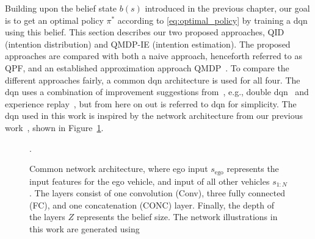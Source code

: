 
Building upon the belief state $b(s)$ introduced in the previous chapter, our goal is to get an optimal policy $\pi^*$ according to \eqref{eq:optimal_policy} by training a \gls{dqn} using this belief. This section describes our two proposed approaches, QID (intention distribution) and QMDP-IE (intention estimation). 
The proposed approaches are compared with both a naive approach, henceforth referred to as QPF, and an established approximation approach QMDP~\cite{Littman1995}. 
To compare the different approaches fairly, a common \gls{dqn} architecture is used for all four. 
The \gls{dqn} uses a combination of improvement suggestions from~\cite{rainbow}, e.g., double \gls{dqn}~\cite{Hasselt2016ddqn} and experience replay~\cite{Lin1992}, but from here on out is referred to \gls{dqn} for simplicity. The \gls{dqn} used in this work is inspired by the network architecture from our previous work~\cite{tram2019}, shown in Figure~\ref{fig:network}. 
\begin{figure}[!h]
    \centering
    
    \caption{Common network architecture, where ego input $s_\mathrm{ego}$ represents the input features for the ego vehicle, and input of all other vehicles $s_{1:N}$. The layers consist of one convolution (Conv), three fully connected (FC), and one concatenation (CONC) layer. Finally, the depth of the layers $Z$ represents the belief size. The network illustrations in this work are generated using \cite{PlotNeuralNet}}.
    \label{fig:network}
\end{figure}

